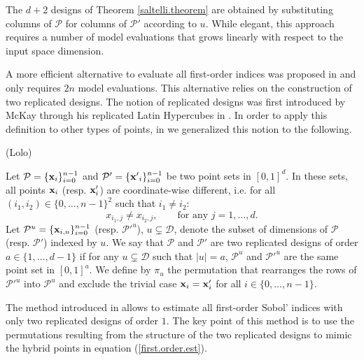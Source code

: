 The $d+2$ designs of Theorem \ref{saltelli.theorem} are obtained by substituting columns of $\mathcal{P}$ for columns of $\mathcal{P}'$ {\color{purple}according} to $u$. While elegant, this approach requires a number of model evaluations that grows linearly with respect to the input space dimension.

A more efficient alternative to evaluate all first-order indices was proposed in \cite{Mara} and only requires $2n$ model evaluations. This alternative relies on the construction of two replicated designs. The notion of replicated designs was first introduced by McKay through his replicated Latin Hypercubes in \cite{McKay}. In order to apply this definition to other types of points, in \cite{GJAHMP} we generalized this notion to the following.

{\color{purple} (Lolo) 
\begin{definition}
\label{rep.designs}
Let $\mathcal{P}=\{\boldsymbol{\mathbf{x}}_i\}_{i=0}^{n-1}$ and $\mathcal{P}'=\{{\boldsymbol{\mathbf{x}}'}_i\}_{i=0}^{n-1}$ be two point sets in $[0,1]^{d}$. In these sets, all points $\boldsymbol{\mathbf{x}}_i$ (resp. $\boldsymbol{\mathbf{x}}'_i$) are coordinate-wise different, i.e. for all $(i_1,i_2) \in \{0,\dots,n-1\}^2$ such that $i_1 \neq i_2$: $$x_{i_1,j} \neq x_{i_2,j}, \qquad \text{for any  } j=1,\dots,d .$$
Let $\mathcal{P}^u=\{\boldsymbol{\mathbf{x}}_{i,u}\}_{i=0}^{n-1}$ (resp. ${\mathcal{P}'}^u$), $u \subsetneq \mathcal{D}$, denote the subset of dimensions of $\mathcal{P}$ (resp. $\mathcal{P}'$) indexed by $u$. We say that $\mathcal{P}$ and $\mathcal{P}'$ are two replicated designs of order $a \in \{1,\dots,d-1\}$ if for any $u \subsetneq \mathcal{D}$ such that $|u|=a$, $\mathcal{P}^u$ and ${\mathcal{P}'}^u$ are the same point set in $[0,1]^a$. We define by $\pi_u$ the permutation that rearranges the rows of ${\mathcal{P}'}^u$ into $\mathcal{P}^u$ and exclude the trivial case $\boldsymbol{\mathbf{x}}_i = \boldsymbol{\mathbf{x}}'_i$ for all $i\in\{0,\dots,n-1\}$.
\end{definition}
}

The method introduced in \cite{Mara} allows to estimate all first-order Sobol' indices with only two replicated designs of order $1$. The key point of this method is to use the permutations resulting from the structure of the two replicated designs to mimic the hybrid points in equation (\ref{first.order.est}). 

